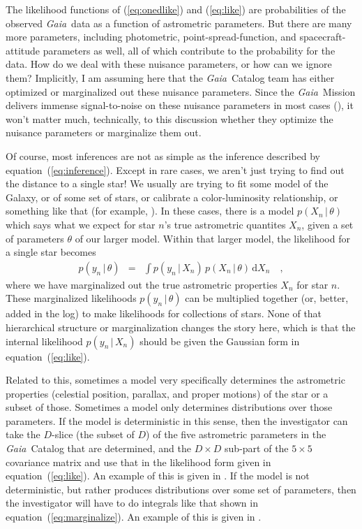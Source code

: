 \documentclass[12pt, modern]{aastex62h}
\newcommand{\Gaia}{\textsl{Gaia}}
\newcommand{\equationname}{equation}
\newcommand{\dd}{\mathrm{d}}
\newcommand{\given}{\,|\,}
\begin{document}
The likelihood functions of (\ref{eq:onedlike}) and (\ref{eq:like}) are
probabilities of the observed \Gaia\ data as a
function of astrometric parameters.
But there are many more parameters, including photometric, point-spread-function,
and spacecraft-attitude parameters as well, all of which contribute to the probability
for the data.
How do we deal with these nuisance parameters, or how can we ignore them?
Implicitly, I am assuming here that the \Gaia\ Catalog team has either optimized
or marginalized out these nuisance parameters.
Since the \Gaia\ Mission delivers immense signal-to-noise on these nuisance
parameters in most cases (\citealt{holl}), it won't matter much, technically, to this
discussion whether they optimize
the nuisance parameters or marginalize them out.

Of course, most inferences are not as simple as the inference described by
\equationname~(\ref{eq:inference}).
Except in rare cases, we aren't just trying to find out the distance to a single
star!
We usually are trying to fit some model of the Galaxy, or of some set of stars,
or calibrate a color-luminosity relationship, or something like that
(for example, \citealt{sesar, hawkins, leistedt, oh, delgado, widmark, anderson}).
In these cases, there is a model $p(X_n\given\theta)$ which says what we expect
for star $n$'s true astrometric quantites $X_n$, given a set of parameters $\theta$
of our larger model.
Within that larger model, the likelihood for a single star becomes
\begin{eqnarray}
p(y_n\given\theta) &=& \int p(y_n\given X_n)\,p(X_n\given\theta)\,\dd X_n
\label{eq:marginalize}
\quad ,
\end{eqnarray}
where we have marginalized out the true astrometric properties $X_n$ for star $n$.
These marginalized likelihoods $p(y_n\given\theta)$
can be multiplied together (or, better, added in the log)
to make likelihoods for collections of stars.
None of that hierarchical structure or marginalization changes the story here,
which is that the internal likelihood $p(y_n\given X_n)$ should be given the
Gaussian form in \equationname~(\ref{eq:like}).

Related to this, sometimes a model very specifically determines the
astrometric properties (celestial position, parallax, and proper
motions) of the star or a subset of those. Sometimes a model only
determines distributions over those parameters.
If the model is deterministic in this sense, then the investigator can take
the $D$-slice (the subset of $D$) of the five astrometric parameters
in the \Gaia\ Catalog that are determined,
and the $D\times D$ sub-part of the $5\times 5$ covariance matrix
and use that in the likelihood form given in \equationname~(\ref{eq:like}).
An example of this is given in \citet{tri2}.
If the model is not deterministic, but rather produces distributions
over some set of parameters, then the investigator will have to do integrals
like that shown in \equationname~(\ref{eq:marginalize}).
An example of this is given in \citet{oh}.
\end{document}

